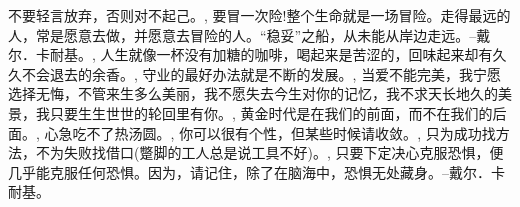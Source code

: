 {
{不要轻言放弃，否则对不起己。},
{要冒一次险!整个生命就是一场冒险。走得最远的人，常是愿意去做，并愿意去冒险的人。“稳妥”之船，从未能从岸边走远。--戴尔．卡耐基。},
{人生就像一杯没有加糖的咖啡，喝起来是苦涩的，回味起来却有久久不会退去的余香。},
{守业的最好办法就是不断的发展。},
{当爱不能完美，我宁愿选择无悔，不管来生多么美丽，我不愿失去今生对你的记忆，我不求天长地久的美景，我只要生生世世的轮回里有你。},
{黄金时代是在我们的前面，而不在我们的后面。},
{心急吃不了热汤圆。},
{你可以很有个性，但某些时候请收敛。},
{只为成功找方法，不为失败找借口(蹩脚的工人总是说工具不好)。},
{只要下定决心克服恐惧，便几乎能克服任何恐惧。因为，请记住，除了在脑海中，恐惧无处藏身。--戴尔．卡耐基。}
}
